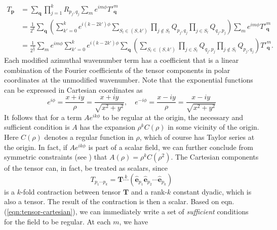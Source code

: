 \documentclass[a4paper, 11pt]{article}
\begin{document}
\begin{equation}\label{eqn:tensor-cartesian}
\begin{aligned}
    T_{\mathbf{p}} &= \sum_{\mathbf{q}} \prod_{j=1}^{k} R_{p_j,q_j} \sum_m e^{im\phi} T'^{m}_{\mathbf{q}} \\
    &= \frac{1}{2^k} \sum_\mathbf{q} \left(\sum_{k'=0}^k e^{i(k-2k')\phi} \sum_{S_l \in (S, k')} \prod_{j\notin S_l} Q_{p_j,q_j} \prod_{j\in S_l} Q_{q_j,p_j}\right) \sum_m e^{im\phi} T'^{m}_\mathbf{q} \\ 
    &= \frac{1}{2^{\frac{k}{2}}} \sum_m e^{im\phi} \sum_{k'=0}^k e^{i(k-2k')\phi} \sum_{\mathbf{q}} \left(\sum_{S_l \in (S, k')} \prod_{j\in S_l} Q_{q_j,p_j} \prod_{j\notin S_l} Q_{p_{j},q_{j}}\right) T'^m_\mathbf{q}.
\end{aligned}
\end{equation}
Each modified azimuthal wavenumber term has a coefficient that is a linear combination of the Fourier coefficients of the tensor components in polar coordinates at the unmodified wavenumber. Note that the exponential functions can be expressed in Cartesian coordinates as
\begin{equation}
    e^{i\phi} = \frac{x + iy}{\rho} = \frac{x + iy}{\sqrt{x^2 + y^2}},\quad 
    e^{-i\phi} = \frac{x - iy}{\rho} = \frac{x - iy}{\sqrt{x^2 + y^2}}
\end{equation}
It follows that for a term $A e^{ik\phi}$ to be regular at the origin, the necessary and sufficient condition is $A$ has the expansion $\rho^k C(\rho)$ in some vicinity of the origin. Here $C(\rho)$ denotes a regular function in $\rho$, which of course has Taylor series at the origin. In fact, if $A e^{ik\phi}$ is part of a scalar field, we can further conclude from symmetric constraints (see \cite{lewis_physical_1990}) that $A(\rho) = \rho^k C(\rho^2)$. The Cartesian components of the tensor can, in fact, be treated as scalars, since
\[
    T_{p_1\cdots p_k} = \mathbf{T} \overset{k}{\cdots} \left(\hat{\mathbf{e}}_{p_1} \hat{\mathbf{e}}_{p_2} \cdots \hat{\mathbf{e}}_{p_k}\right)
\]
is a $k$-fold contraction between tensor $\mathbf{T}$ and a rank-$k$ constant dyadic, which is also a tensor. The result of the contraction is then a scalar. Based on eqn. (\ref{eqn:tensor-cartesian}), we can immediately write a set of \textit{sufficient} conditions for the field to be regular. At each $m$, we have
\end{document}

